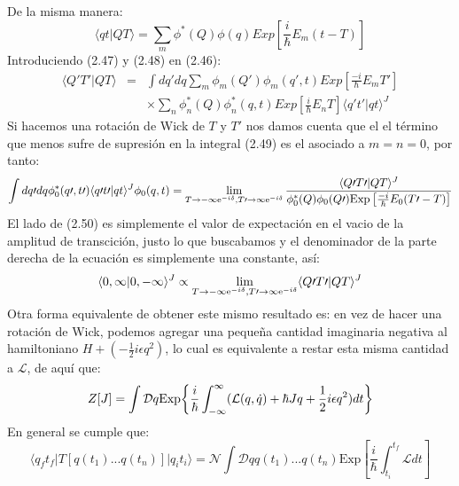 De la misma manera:
\begin{equation}
\langle qt|	QT  \rangle=\sum_{m}\phi^{*}(Q)\phi(q)Exp\left[\frac{i}{\hbar}E_{m}(t-T)\right]
\end{equation}
Introduciendo (2.47) y (2.48) en (2.46):
\begin{eqnarray}
\nonumber \langle Q\prime T\prime|QT\rangle &=&\int dq\prime dq\sum_{m}\phi_{m}(Q\prime)\phi_{m}(q\prime,t)Exp\left[\frac{-i}{\hbar}E_{m}T\prime\right]\\
&&\times  \sum_{n}\phi_{n}^{*}(Q)\phi_{n}^{*}(q,t)Exp\left[\frac{i}{\hbar}E_{n}T\right]\langle q\prime t\prime|qt\rangle^{J}
\end{eqnarray}
Si hacemos una rotación de Wick de $T$ y $T\prime $ nos damos cuenta que el el término que menos sufre de supresión en la integral (2.49) es el asociado a $m=n=0$, por tanto:
\begin{equation}
\int dq\prime dq\phi_{0}^{*}(q\prime,t\prime)\langle q\prime t\prime|qt\rangle^{J}\phi_{0}(q,t)=\lim_{T\to-\text{\ensuremath{\infty}e}^{-i\delta},T\prime\to\text{\ensuremath{\infty}e}^{-i\delta}}\frac{\langle Q\prime T\prime|QT\rangle^{J}}{\phi_{0}^{*}(Q)\phi_{0}(Q\prime)\text{Exp}\left[\frac{-i}{\hbar}E_{0}(T\prime-T)\right]}
\end{equation}
El lado de (2.50) es simplemente el valor de expectación en el vacio de la amplitud de transcición, justo lo que buscabamos y el denominador de la parte derecha de la ecuación es simplemente una constante, así:
\begin{equation}
\langle 0,\infty| 0,-\infty \rangle ^J \propto \lim_{T\to-\text{\ensuremath{\infty}e}^{-i\delta},T\prime\to\text{\ensuremath{\infty}e}^{-i\delta}}\langle Q\prime T\prime|QT\rangle^{J}
\end{equation}
Otra forma equivalente de obtener este mismo resultado es: en vez de hacer una rotación de Wick, podemos agregar una pequeña cantidad imaginaria negativa al hamiltoniano $H+(-\frac{1}{2}i\epsilon q^2)$, lo cual es equivalente a restar esta misma cantidad a $\mathcal{L}$, de aquí que:
\begin{equation}
Z[J]=\int\mathcal{D}q\text{Exp\ensuremath{\left\{ \frac{i}{\hbar}\int_{-\infty}^{\infty}(\mathcal{L}(q,\dot{q})+\hbar Jq + \frac{1}{2}i\epsilon q^2)dt\right\} }}
\end{equation}
En general se cumple que:
\begin{equation}
 \langle q_{f}t_{f}|T[q(t_{1})...q(t_{n})]|q_{i}t_{i}\rangle=\mathcal{N}\int\mathcal{D}qq(t_{1})...q(t_{n})\text{Exp}\left[\frac{i}{\hbar}\int_{t_{i}}^{t_{f}}\mathcal{L}dt\right]
\end{equation}
